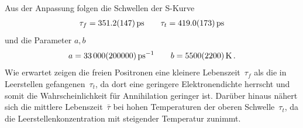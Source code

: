 \documentclass[11pt, a4paper]{article}
\numberwithin{equation}{section}
\begin{document}
Aus der Anpassung folgen die Schwellen der S-Kurve
\begin{align*}
	\tau_f = \SI{351.2 +- 14.7}{ps} \qquad	\tau_t = \SI{419.0 +- 17.3}{ps}
\end{align*}
und die Parameter $a, b$
\begin{align*}
	a = \SI{33000 +- 200000}{\per\pico\second} \qquad b = \SI{5500 +- 2200}{\kelvin} \, \text{.}
\end{align*}
Wie erwartet zeigen die freien Positronen eine kleinere Lebenszeit~$\tau_f$ als die in Leerstellen gefangenen~$\tau_t$, da dort eine geringere Elektronendichte herrscht und somit die Wahrscheinlichkeit für Annihilation geringer ist.
Darüber hinaus nähert sich die mittlere Lebenszeit~$\bar{\tau}$ bei hohen Temperaturen der oberen Schwelle~$\tau_t$, da die Leerstellenkonzentration mit steigender Temperatur zunimmt.
\end{document}
